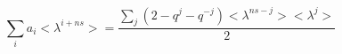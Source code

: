 \begin{equation}\label{eq:quantum1}
\sum_i a_i <\lambda^{i+ns}> = \frac
{\sum_j(2-q^j-q^{-j})<\lambda^{ns-j}><\lambda^j> }{2}
\end{equation}

